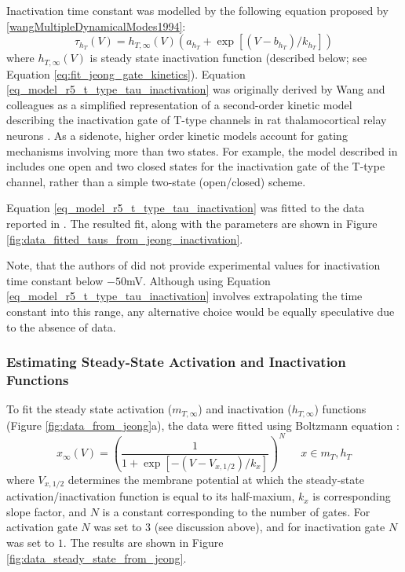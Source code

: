 \documentclass[../main.tex]{subfiles}
\begin{document}
Inactivation time constant was modelled by the following equation proposed by \ref{wangMultipleDynamicalModes1994}:
\begin{equation}\label{eq_model_r5_t_type_tau_inactivation}
    \tau_{h_T}(V) = h_{T,\infty}(V)(a_{h_T} + \exp{[(V - b_{h_T})/k_{h_T}]})
\end{equation}
where $h_{T,\infty}(V)$ is steady state inactivation function (described below; see Equation \ref{eq:fit_jeong_gate_kinetics}). Equation \ref{eq_model_r5_t_type_tau_inactivation} was originally derived by Wang and colleagues as a simplified representation of a second-order kinetic model describing the inactivation gate of T-type channels in rat thalamocortical relay neurons \parencite{wangModelTtypeCalcium1991}. As a sidenote, higher order kinetic models account for gating mechanisms involving more than two states. For example, the model described in \parencite{wangModelTtypeCalcium1991} includes one open and two closed states for the inactivation gate of the T-type channel, rather than a simple two-state (open/closed) scheme.

Equation \ref{eq_model_r5_t_type_tau_inactivation} was fitted to the data reported in \parencite{jeongCaa1TFlyTtype2015}. The resulted fit, along with the parameters are shown in Figure \ref{fig:data_fitted_taus_from_jeong_inactivation}.

Note, that the authors of \parencite{jeongCaa1TFlyTtype2015} did not provide experimental values for inactivation time constant below $-50$mV. Although using Equation \ref{eq_model_r5_t_type_tau_inactivation} involves extrapolating the time constant into this range, any alternative choice would be equally speculative due to the absence of data.

\subsubsection{Estimating Steady-State Activation and Inactivation Functions}

To fit the steady state activation ($m_{T,\infty}$) and inactivation ($h_{T,\infty}$) functions (Figure \ref{fig:data_from_jeong}a), the data were fitted using Boltzmann equation \parencite{huguenardSimulationCurrentsInvolved1992}:
\begin{equation} \label{eq:fit_jeong_gate_kinetics}
    x_\infty(V) = \left( \frac{1}{1 + \exp{[-(V - V_{x,1/2})/k_x]}} \right)^N \;\;\;\;\; x \in {m_T, h_T}
\end{equation}
where $V_{x,1/2}$ determines the membrane potential at which the steady-state activation/inactivation function is equal to its half-maxium, $k_x$ is corresponding slope factor,
and $N$ is a constant corresponding to the number of gates. For activation gate $N$ was set to $3$ (see discussion above), and for inactivation gate $N$ was set to $1$.
The results are shown in Figure \ref{fig:data_steady_state_from_jeong}.
\end{document}
